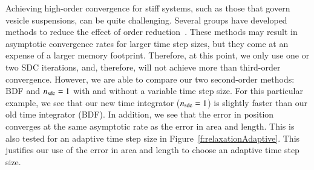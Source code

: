 Achieving high-order convergence for stiff systems, such as those that
govern vesicle suspensions, can be quite challenging.  Several groups
have developed methods to reduce the effect of order
reduction~\cite{min2003, wei2013, jia:hua2008,
spe:rup:emm:min:bol:kra2014, spe:rup:min:emm:kra2014}.  These methods
may result in asymptotic convergence rates for larger time step sizes,
but they come at an expense of a larger memory footprint.  Therefore,
at this point, we only use one or two SDC iterations, and, therefore,
will not achieve more than third-order convergence.  However, we are
able to compare our two second-order methods: BDF and $n_{{\mathrm{sdc}}}=1$ with
and without a variable time step size.  For this particular example, we
see that our new time integrator ($n_{{\mathrm{sdc}}}=1$) is slightly faster than
our old time integrator (BDF).  In addition, we see that the error in
position converges at the same asymptotic rate as the error in area and
length.  This is also tested for an adaptive time step size in
Figure~\ref{f:relaxationAdaptive}.  This justifies our use of the error
in area and length to choose an adaptive time step size.


%
%
%

